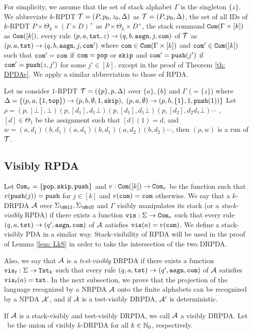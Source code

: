 \medskip
For simplicity,
we assume that the set of stack alphabet $\Gamma$
is the singleton $\{z\}$.
We abbreviate
$k$-RPDT ${\cal T}=(P, p_0, z_0, \Delta)$ as ${\cal T}=(P, p_0, \Delta)$,
the set of all
IDs of $k$-RPDT $P\times\Theta_k\times(\Gamma\times D)^+$
as $P\times\Theta_k\times D^+$,
the stack command $\mathtt{Com}(\Gamma\times[k])$ as $\mathtt{Com}([k])$,
every rule $(p, a, \mathtt{tst}, z) \to (q, b, \mathtt{asgn}, j, \mathtt{com})$ of ${\cal T}$ as
$(p, a, \mathtt{tst}) \to (q, b, \mathtt{asgn}, j, \mathtt{com}')$ where
$\mathtt{com}\in\mathtt{Com}(\Gamma\times[k])$ and $\mathtt{com}'\in\mathtt{Com}([k])$
such that $\mathtt{com}'=\mathtt{com}$ if $\mathtt{com}=\mathtt{pop}$ or $\mathtt{skip}$ and
$\mathtt{com}'=\mathtt{push}(j')$ if $\mathtt{com}'=\mathtt{push}(z,j')$ for some $j'\in[k]$.
except in the proof of Theorem \ref{th: DPDAv}.
We apply a similar abbreviation to those of RPDA.

\begin{example}
\label{ex: RPDT}
Let us consider $1$-RPDT
${\cal T} = (\{p\},p,\Delta)$
over $\{a\},\{b\}$
and $\Gamma$ ($=\{z\}$) where
$\Delta = \{
(p, a, \{1,\mathtt{top}\}) \rightarrow (p, b, \emptyset, 1, \mathtt{skip}),$
$(p, a, \emptyset) \rightarrow (p, b, \{1\}, 1, \mathtt{push}(1))
\}$
Let $\rho=(p,[\bot],\bot)(p,[d_1],d_1\bot)(p,[d_1],d_1\bot)(p,[d_2],d_2d_1\bot)\cdots$
, $[d]\in\Theta_1$ be the assignment such that $[d](1)=d$,
and
$w=(a,d_1)(b,d_1)(a,d_1)(b,d_1)(a,d_2)(b,d_2)\cdots$,
then $(\rho,w)$ is a run of ${\cal T}$.
\end{example}

\subsection{Visibly RPDA}
Let $\mathtt{Com}_v=\{\mathtt{pop},\mathtt{skip},\mathtt{push}\}$ and $v:\mathtt{Com}([k])\to\mathtt{Com}_v$ be the function such that $v(\mathtt{push}(j))=\mathtt{push}$ for $j\in[k]$ and $v(\mathtt{com})=\mathtt{com}$ otherwise.
We say that a $k$-DRPDA ${\cal A}$
over $\Sigma_\dblI,\Sigma_\dblO$ and $\Gamma$
visibly manipulates its stack (or a {\em stack-visibly} RPDA) if
there exists a function $\mathtt{vis}: \Sigma\to\mathtt{Com}_v$
such that
every rule $(q,a,\mathtt{tst})\to(q',\mathtt{asgn},\mathtt{com})$ of ${\cal A}$
satisfies $\mathtt{vis}(a)=v(\mathtt{com})$.
We define a stack-visibly PDA in a similar way.
Stack-visibility of RPDA will be used
in the proof of Lemma \ref{lem: LkS}
in order to take the intersection of the two DRPDA.

Also, we say that ${\cal A}$ is a {\em test-visibly} DRPDA if
there exists a function $\mathtt{vis}_t: \Sigma\to\mathtt{Tst}_k$
such that
every rule $(q,a,\mathtt{tst})\to(q',\mathtt{asgn},\mathtt{com})$ of ${\cal A}$
satisfies $\mathtt{vis}_t(a)=\mathtt{tst}$.
In the next subsection,
we prove that the projection of the language recognized by
a NRPDA ${\cal A}$ onto the finite alphabets
can be recognized by a NPDA ${\cal A}'$,
and if ${\cal A}$ is a test-visibly DRPDA,
${\cal A}'$ is deterministic.

If ${\cal A}$ is a stack-visibly and test-visibly DRPDA,
we call ${\cal A}$ a visibly DRPDA.
Let \DRPDAv\ be the union of visibly $k$-DRPDA for all $k\in\mathbb{N}_0$, respectively.
